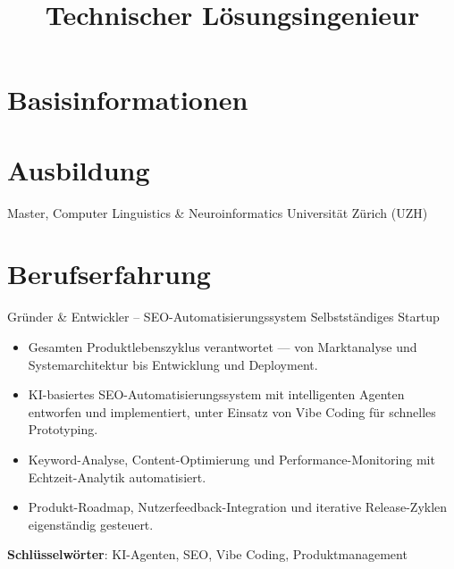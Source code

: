 \documentclass[a4paper, serif, 10pt]{moderncv}
\title{Technischer Lösungsingenieur}
\begin{document}
\maketitle

\section{Basisinformationen}


\section{Ausbildung}

        {Master, Computer Linguistics \& Neuroinformatics}
        {Universität Zürich (UZH)}
        {}
        {}
        {}

\section{Berufserfahrung}

        {Gründer \& Entwickler – SEO-Automatisierungssystem}
        {Selbstständiges Startup}
        {}
        {}
        {\begin{itemize}
\item Gesamten Produktlebenszyklus verantwortet — von Marktanalyse und Systemarchitektur bis Entwicklung und Deployment.
\item KI-basiertes SEO-Automatisierungssystem mit intelligenten Agenten entworfen und implementiert, unter Einsatz von Vibe Coding für schnelles Prototyping.
\item Keyword-Analyse, Content-Optimierung und Performance-Monitoring mit Echtzeit-Analytik automatisiert.
\item Produkt-Roadmap, Nutzerfeedback-Integration und iterative Release-Zyklen eigenständig gesteuert.
\end{itemize}
\textbf{Schlüsselwörter}: KI-Agenten, SEO, Vibe Coding, Produktmanagement}
\end{document}
